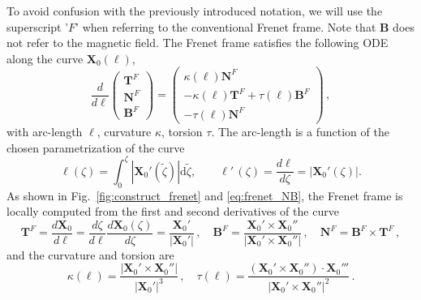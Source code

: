 \documentclass[12pt]{iopart}
\newcommand\hlchangedrev[1]{#1} %
\newcommand\dd[2]{\frac{d #1}{d #2}}
\newcommand\el{\ell}
\newcommand\elp{\el'}
\newcommand\elpp{\el''}
\newcommand\X{{\bm{X}}_0}
\newcommand\Xp{\X'}
\newcommand\Xpp{\X''}
\newcommand\Xppp{\X'''}
\newcommand\Tfrenet{{\bm T}^F}
\newcommand\Nfrenet{{\bm N}^F}
\newcommand\Bfrenet{{\bm B}^F}
\begin{document}
\hlchangedrev{To avoid confusion with the previously introduced notation,} we will use the superscript '$F$' when referring to the conventional Frenet frame. Note that $\bm B$ \hlchangedrev{does not refer to the magnetic field.}
The Frenet frame satisfies the following ODE along the curve $\X(\el)$, 
\begin{equation}
			 \dd{}{\el}\begin{pmatrix}
				\Tfrenet\\\Nfrenet\\\Bfrenet
			 \end{pmatrix} = \begin{pmatrix}
				\kappa(\el) \Nfrenet\\-\kappa(\el) \Tfrenet + \tau(\el) \Bfrenet\\- \tau(\el) \Nfrenet
			 \end{pmatrix} \,, \label{eq:frenet_ode}
\end{equation}
with arc-length $\el$, curvature $\kappa$, torsion $\tau$. 
The arc-length is a function of the chosen parametrization of the curve
\begin{equation}
			\el(\zeta) = \int_0^\zeta |\Xp(\tilde{\zeta})| \mathrm{d}\tilde{\zeta} ,\qquad \elp\,(\zeta)  = \dd{\el}{\zeta} =|\Xp(\zeta)|. %
            \label{eq:frenet_arclength}
 \end{equation}
 As shown in Fig.~\ref{fig:construct_frenet} and \eqref{eq:frenet_NB}, the  Frenet frame is locally computed from the first and second derivatives of the curve
 \begin{equation}
\Tfrenet=  \dd{\X}{\el} = \dd{\zeta}{\el} \dd{\X(\zeta)}{\zeta}=\frac{\Xp}{|\Xp|}\,,\quad  \Bfrenet=\frac{\Xp\times\Xpp}{|\Xp\times\Xpp|}\,,\quad \Nfrenet=\Bfrenet\times \Tfrenet\,, \label{eq:frenet_NB}
\end{equation}
and the curvature and torsion are
\begin{equation}
    \kappa(\el) = \frac{\left|\Xp\times\Xpp\right|}{|\Xp|^3}\,,\quad \tau(\el) = \frac{(\Xp\times\Xpp)\cdot\Xppp}{|\Xp\times\Xpp|^2}\,.
\end{equation}
%
\end{document}
